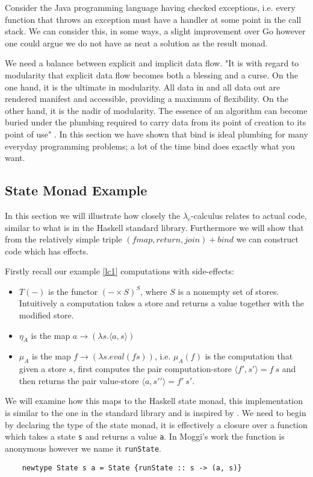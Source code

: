 Consider the Java programming language having checked exceptions,
i.e. every function that throws an exception must have a handler
at some point in the call stack.
We can consider this, in some ways, a slight improvement
over Go however one could argue we do not have as neat a solution
as the result monad.

We need a balance between explicit and implicit data flow.
"It is with regard to modularity that explicit data flow becomes both a blessing and a curse.
On the one hand, it is the ultimate in modularity.
All data in and all data out are rendered manifest and accessible, providing a maximum of flexibility. On the other hand, it is the nadir of modularity. The essence of an algorithm can become buried under the plumbing required to carry data from its point of creation to its point of use"
\cite{wadler1995monads}.
In this section we have shown that bind is ideal plumbing
for many everyday programming problems;
a lot of the time bind does exactly what you want.

\subsection{State Monad Example}
In this section we will illustrate how closely
the $\lambda_c$-calculus relates to actual code,
similar to what is in the Haskell standard library.
Furthermore we will show that from the relatively
simple triple $(fmap,return,join) + bind$ we can
construct code which has effects.

Firstly recall our example \ref{lc1} computations with
side-effects\cite{moggi1989computational}:
\begin{itemize}
    \item $T(-)$ is the functor $(-\times S)^S$, where $S$ is a nonempty set of stores.
        Intuitively a computation takes a store and returns a value together with the modified store.
    \item $\eta_A$ is the map $a \rightarrow (\lambda s.\langle a,s \rangle)$
    \item $\mu_A$ is the map $f \rightarrow (\lambda s.eval(fs))$,
        i.e. $\mu_A(f)$ is the computation that given a store $s$,
        first computes the pair computation-store $\langle f\prime,s\prime\rangle = f\ s$
        and then returns the pair value-store $\langle a,s\prime\prime\rangle = f\prime\ s\prime$.
\end{itemize}

We will examine how this maps to the Haskell state monad,
this implementation is similar to the one in the standard library
and is inspired by \cite{jones1995functional}.
We need to begin by declaring the type of the state monad,
it is effectively a closure over a function
which takes a state \texttt{s} and returns a value \texttt{a}.
In Moggi's work the function is anonymous however we name it
\texttt{runState}.
\begin{verbatim}
    newtype State s a = State {runState :: s -> (a, s)}
\end{verbatim}

